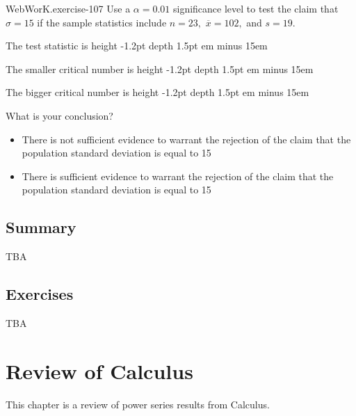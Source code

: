\documentclass[10pt,]{book}
\newcommand{\fillin}[1]{\leavevmode\leaders\vrule height -1.2pt depth 1.5pt \hskip #1em minus #1em \null}
\numberwithin{equation}{section}
\begin{document}
\begin{inlineexercise}{WebWorK.}{exercise-107}%
\hypertarget{p-1522}{}%
Use a \(\alpha = 0.01\) significance level to test the claim that \(\sigma = 15\) if the sample statistics include \(n = 23,\) \(\overline{x} = 102,\) and \(s = 19.\)%
\par
\hypertarget{p-1523}{}%
The test statistic is  \fillin{15}%
\par
\hypertarget{p-1524}{}%
The smaller critical number is  \fillin{15}%
\par
\hypertarget{p-1525}{}%
The bigger critical number is  \fillin{15}%
\par
\hypertarget{p-1526}{}%
What is your conclusion?%
\par
\hypertarget{p-1527}{}%
\par
\begin{itemize}[label=$\odot$,leftmargin=3em,]
\item{}\hypertarget{p-1528}{}%
There is not sufficient evidence to warrant the rejection of the claim that the population standard deviation is equal to 15%

\item{}\hypertarget{p-1529}{}%
There is sufficient evidence to warrant the rejection of the claim that the population standard deviation is equal to 15%

\end{itemize}
%
\end{inlineexercise}
%
%
%
\typeout{************************************************}
\typeout{************************************************}
%
\section[{Summary}]{Summary}\label{section-77}
\hypertarget{p-1530}{}%
TBA%
%
%
\typeout{************************************************}
\typeout{************************************************}
%
\section[{Exercises}]{Exercises}\label{section-78}
\hypertarget{p-1531}{}%
TBA%
%
%
\typeout{************************************************}
\typeout{************************************************}
%
\chapter[{Review of Calculus}]{Review of Calculus}\label{PowerSeriesReview}
\hypertarget{p-1532}{}%
This chapter is a review of power series results from Calculus.%
%
%
\typeout{************************************************}
\typeout{************************************************}
%
\end{document}
